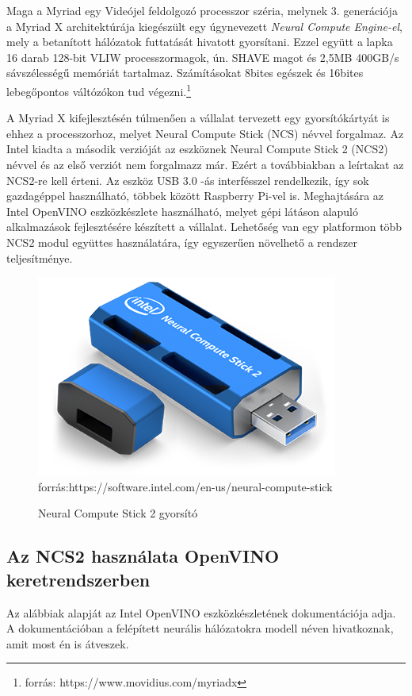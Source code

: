 Maga a Myriad egy Videójel feldolgozó processzor széria, melynek 3. generációja a Myriad X architektúrája kiegészült egy úgynevezett \emph{Neural Compute Engine-el}, mely a betanított hálózatok futtatását hivatott gyorsítani. Ezzel együtt a lapka 16 darab 128-bit VLIW processzormagok, ún. SHAVE magot és 2,5MB 400GB/s sávszélességű memóriát tartalmaz. Számításokat 8bites egészek és 16bites lebegőpontos váltózókon tud végezni.\footnote{forrás: https://www.movidius.com/myriadx} 

A Myriad X kifejlesztésén túlmenően a vállalat tervezett egy gyorsítókártyát is ehhez a processzorhoz, melyet Neural Compute Stick (NCS) névvel forgalmaz. Az Intel kiadta a második verzióját az eszköznek  Neural Compute Stick 2 (NCS2) névvel és az első verziót nem forgalmazz már. Ezért a továbbiakban a leírtakat az NCS2-re kell érteni.
Az eszköz USB 3.0 -ás interfésszel rendelkezik, így sok gazdagéppel használható, többek között Raspberry Pi-vel is. Meghajtására az Intel OpenVINO eszközkészlete használható, melyet gépi látáson alapuló alkalmazások fejlesztésére készített a vállalat. Lehetőség van egy platformon több NCS2 modul együttes használatára, így egyszerűen növelhető a rendszer teljesítménye.
\begin{figure}[h]
	\centering
	\includegraphics[width=0.5\linewidth]{fig/NCS2-specs}\\
	\footnotesize forrás:https://software.intel.com/en-us/neural-compute-stick
	\caption{Neural Compute Stick 2 gyorsító} 
	\label{fig:ncs2-specs}
\end{figure}

\subsection{Az NCS2 használata OpenVINO keretrendszerben}
Az alábbiak alapját az Intel OpenVINO eszközkészletének dokumentációja adja.\cite{web:OpenVINO} A dokumentációban a felépített neurális hálózatokra modell néven hivatkoznak, amit most én is átveszek.

